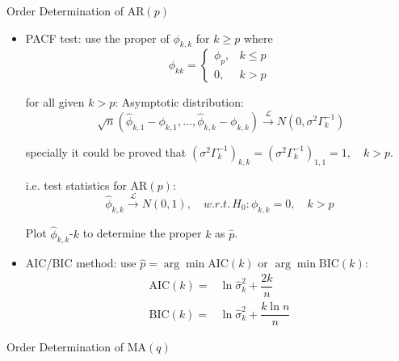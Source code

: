 \begin{point}
    Order Determination of AR$ (p) $
\end{point}
\begin{itemize}[topsep=2pt,itemsep=0pt]
    \item PACF test: use the proper of $ \phi _{k,k} $ for $ k\geq p $ where  
    \begin{equation}
        \phi _{kk}=\begin{cases}
            \phi _p,&k\leq p\\
            0,&k>p
        \end{cases} 
    \end{equation}

    for all given $ k> p $: Asymptotic distribution:
    \begin{equation}
        \sqrt[]{n}(\hat{\phi }_{k,1}-\phi _{k,1},\ldots, \hat{\phi }_{k,k}-\phi _{k,k})\xrightarrow[]{\mathscr{L}} N(0,\sigma ^2\Gamma _k^{-1}) 
    \end{equation}

    specially it could be proved that $ \left(\sigma ^2\Gamma ^{-1}_{k}\right)_{k,k}=\left(\sigma ^2\Gamma ^{-1}_{k}\right)_{1,1}=1,\quad k>p $.
    
    i.e. test statistics for AR$ (p) $:
    \begin{equation}
        \hat{\phi }_{k,k}\xrightarrow[]{\mathscr{L}}  N(0,1),\quad w.r.t.\, H_0:\phi _{k,k}=0 ,\quad k>p
    \end{equation}
    
    Plot $ \hat{\phi }_{k,k} $-$ k $ to determine the proper $ k $ as $ \hat{p} $.
    \item AIC/BIC method: use $\hat{p}= \arg\min \mathrm{AIC}(k)  $ or $ \arg\min\mathrm{BIC}(k)  $:
    \begin{align*}
        \mathrm{AIC}(k)=&\ln \hat{\sigma }_k^2+\dfrac{2k}{n}\\
        \mathrm{BIC}(k)=&\ln \hat{\sigma }_k^2+\dfrac{k\ln n}{n}
    \end{align*}
\end{itemize}


\begin{point}
    Order Determination of MA$ (q) $
\end{point}

